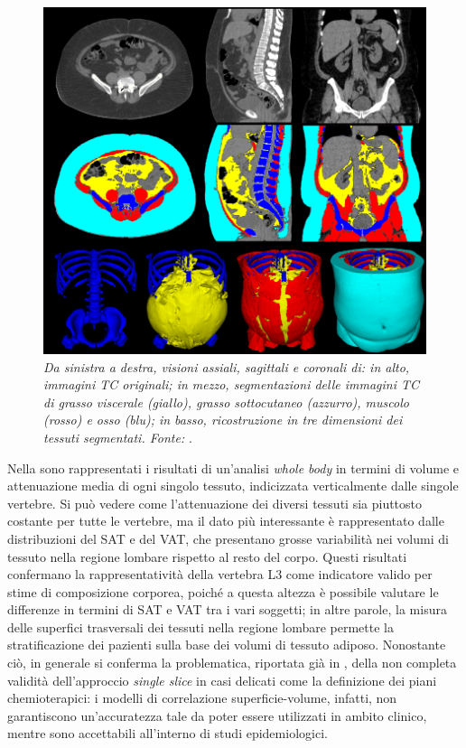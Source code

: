 \begin{figure}[htp]
\centering
\includegraphics[scale=0.8]{Immagini/ma_3d.png}
\caption{\label{fig:ma_3d} \textit{Da sinistra a destra, visioni assiali, sagittali e coronali di: in alto, immagini TC originali; in mezzo, segmentazioni delle immagini TC di grasso viscerale (giallo), grasso sottocutaneo (azzurro), muscolo (rosso) e osso (blu); in basso, ricostruzione in tre dimensioni dei tessuti segmentati. Fonte:} \cite{Ma2021}.}
\end{figure}

Nella  sono rappresentati i risultati di un’analisi \textit{whole body} in termini di volume e attenuazione media di ogni singolo tessuto, indicizzata verticalmente dalle singole vertebre. Si può vedere come l’attenuazione dei diversi tessuti sia piuttosto costante per tutte le vertebre, ma il dato più interessante è rappresentato dalle distribuzioni del SAT e del VAT, che presentano grosse variabilità nei volumi di tessuto nella regione lombare rispetto al resto del corpo. Questi risultati confermano la rappresentatività della vertebra L3 come indicatore valido per stime di composizione corporea, poiché a questa altezza è possibile valutare le differenze in termini di SAT e VAT tra i vari soggetti; in altre parole, la misura delle superfici trasversali dei tessuti nella regione lombare permette la stratificazione dei pazienti sulla base dei volumi di tessuto adiposo. Nonostante ciò, in generale si conferma la problematica, riportata già in \cite{Shen2004}, della non completa validità dell'approccio \textit{single slice} in casi delicati come la definizione dei piani chemioterapici: i modelli di correlazione superficie-volume, infatti, non garantiscono un'accuratezza tale da poter essere utilizzati in ambito clinico, mentre sono accettabili all'interno di studi epidemiologici.

